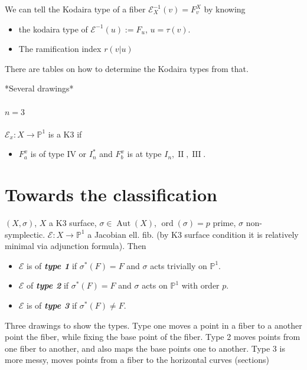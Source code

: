 	We can tell the Kodaira type of a fiber $\mathcal{E}^{-1}_X(v)=F^X_v$ by knowing
	\begin{itemize}
	\item the kodaira type of $\mathcal{E}^{-1}(u):=F_u$, $u=\tau(v)$.
	\item The ramification index $r(v|u)$
	\end{itemize}

	There are tables on how to determine the Kodaira types from that.

*Several drawings*

\paragraph{$n=3$} $\mathcal{E}_{x}:X\to \mathbb{P}^1$ is a K3 if
\begin{itemize}
\item $F_a^x$ is of type IV or $I^*_n$ and $F^x_b$ is at type $I_n, \operatorname{I I},\operatorname{I I I }$.
\end{itemize}

\section{Towards the classification}

\begin{defn}
$(X,\sigma)$, $X$ a K3 surface, $\sigma\in\operatorname{Aut}(X)$, $\operatorname{ord}(\sigma)=p$ prime, $\sigma$ non-symplectic. $\mathcal{E}:X\to \mathbb{P}^1$ a Jacobian ell. fib. (by K3 surface condition it is relatively minimal via adjunction formula). Then

\begin{itemize}
\item $\mathcal{E}$ is of \textit{\textbf{type 1}} if $\sigma^*(F)=F$ and $\sigma$ acts trivially on $\mathbb{P}^1$.
\item $\mathcal{E}$ of \textit{\textbf{type 2}} if  $\sigma^*(F)=F$ and $\sigma$ acts on $\mathbb{P}^1$ with order $p$.
\item $\mathcal{E}$ is of \textit{\textbf{type 3}} if $\sigma^*(F)\neq F$.
\end{itemize}
\end{defn}

Three drawings to show the types. Type one moves a point in a fiber to a another point the fiber, while fixing the base point of the fiber. Type 2 moves points from one fiber to another, and also maps the base points one to another. Type 3 is more messy, moves points from a fiber to the horizontal curves (sections)

